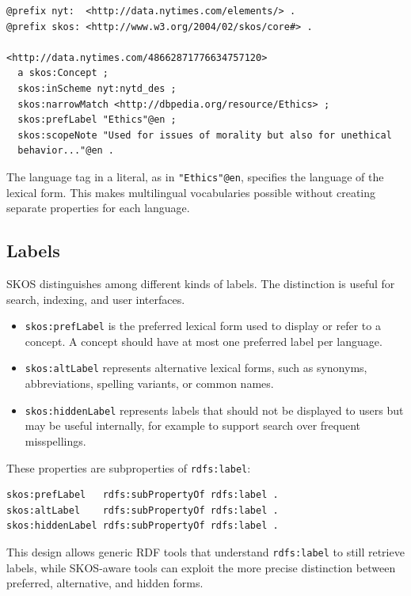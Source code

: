 \documentclass{scrbook}
\begin{document}
	\begin{lstlisting}
@prefix nyt:  <http://data.nytimes.com/elements/> .
@prefix skos: <http://www.w3.org/2004/02/skos/core#> .
	
<http://data.nytimes.com/48662871776634757120>
  a skos:Concept ;
  skos:inScheme nyt:nytd_des ;
  skos:narrowMatch <http://dbpedia.org/resource/Ethics> ;
  skos:prefLabel "Ethics"@en ;
  skos:scopeNote "Used for issues of morality but also for unethical
  behavior..."@en .
	\end{lstlisting}
	
	The language tag in a literal, as in \texttt{"Ethics"@en}, specifies the language of the lexical form. This makes multilingual vocabularies possible without creating separate properties for each language.
	
	\subsection{Labels}
	
	SKOS distinguishes among different kinds of labels. The distinction is useful for search, indexing, and user interfaces.
	
	\begin{itemize}
	    \item \texttt{skos:prefLabel} is the preferred lexical form used to display or refer to a concept. A concept should have at most one preferred label per language.
	    \item \texttt{skos:altLabel} represents alternative lexical forms, such as synonyms, abbreviations, spelling variants, or common names.
	    \item \texttt{skos:hiddenLabel} represents labels that should not be displayed to users but may be useful internally, for example to support search over frequent misspellings.
	\end{itemize}
	
	These properties are subproperties of \texttt{rdfs:label}:
	
	\begin{lstlisting}
skos:prefLabel   rdfs:subPropertyOf rdfs:label .
skos:altLabel    rdfs:subPropertyOf rdfs:label .
skos:hiddenLabel rdfs:subPropertyOf rdfs:label .
	\end{lstlisting}
	
	This design allows generic RDF tools that understand \texttt{rdfs:label} to still retrieve labels, while SKOS-aware tools can exploit the more precise distinction between preferred, alternative, and hidden forms.
	
\end{document}
